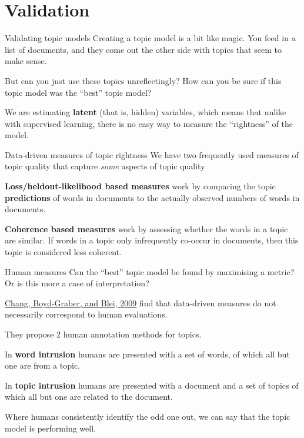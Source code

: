\documentclass[
  10pt,
  ignorenonframetext,
  aspectratio=169]{beamer}
\begin{document}
\hypertarget{validation}{%
\section{Validation}\label{validation}}

\begin{frame}{Validating topic models}
\protect\hypertarget{validating-topic-models}{}
Creating a topic model is a bit like magic. You feed in a list of
documents, and they come out the other side with topics that seem to
make sense.

But can you just use these topics unreflectingly? How can you be sure if
this topic model was the ``best'' topic model?

We are estimating \textbf{latent} (that is, hidden) variables, which
means that unlike with supervised learning, there is no easy way to
measure the ``rightness'' of the model.
\end{frame}

\begin{frame}{Data-driven measures of topic rightness}
\protect\hypertarget{data-driven-measures-of-topic-rightness}{}
We have two frequently used measures of topic quality that capture
\emph{some} aspects of topic quality

\textbf{Loss/heldout-likelihood based measures} work by comparing the
topic \textbf{predictions} of words in documents to the actually
observed numbers of words in documents.

\textbf{Coherence based measures} work by assessing whether the words in
a topic are similar. If words in a topic only infrequently co-occur in
documents, then this topic is considered less coherent.
\end{frame}

\begin{frame}{Human measures}
\protect\hypertarget{human-measures}{}
Can the ``best'' topic model be found by maximising a metric? Or is this
more a case of interpretation?

\href{https://proceedings.neurips.cc/paper/2009/file/f92586a25bb3145facd64ab20fd554ff-Paper.pdf}{Chang,
Boyd-Graber, and Blei, 2009} find that data-driven measures do not
necessarily correspond to human evaluations.

They propose 2 human annotation methods for topics.

In \textbf{word intrusion} humans are presented with a set of words, of
which all but one are from a topic.

In \textbf{topic intrusion} humans are presented with a document and a
set of topics of which all but one are related to the document.

Where humans consistently identify the odd one out, we can say that the
topic model is performing well.
\end{frame}
\end{document}
